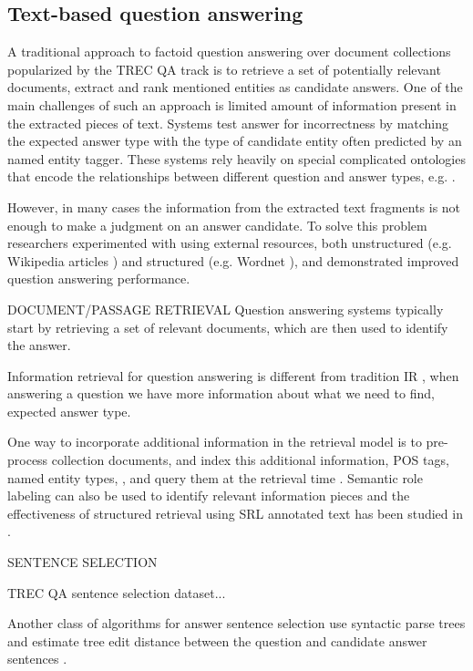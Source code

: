 \subsection{Text-based question answering}

A traditional approach to factoid question answering over document collections popularized by the TREC QA track is to retrieve a set of potentially relevant documents, extract and rank mentioned entities as candidate answers.
One of the main challenges of such an approach is limited amount of information present in the extracted pieces of text.
Systems test answer for incorrectness by matching the expected answer type with the type of candidate entity often predicted by an named entity tagger.
These systems rely heavily on special complicated ontologies that encode the relationships between different question and answer types, e.g. \cite{hovy2000question,LiRoth02,li2006learning, prager2006question}.

However, in many cases the information from the extracted text fragments is not enough to make a judgment on an answer candidate.
To solve this problem researchers experimented with using external resources, both unstructured (e.g. Wikipedia articles  \cite{ahn2005using, buscaldi2006mining}) and structured (e.g. Wordnet \cite{pasca2001informative}), and demonstrated improved question answering performance.


DOCUMENT/PASSAGE RETRIEVAL
Question answering systems typically start by retrieving a set of relevant documents, which are then used to identify the answer.

Information retrieval for question answering is different from tradition IR \cite{keikha2014retrieving}, \ie when answering a question we have more information about what we need to find, \eg expected answer type.

One way to incorporate additional information in the retrieval model is to pre-process collection documents, and index this additional information, \eg POS tags, named entity types, \etc, and query them at the retrieval time \cite{yao2013automatic}.
Semantic role labeling can also be used to identify relevant information pieces and the effectiveness of structured retrieval using SRL annotated text has been studied in \cite{bilotti2007structured}.

SENTENCE SELECTION

TREC QA sentence selection dataset...

Another class of algorithms for answer sentence selection use syntactic parse trees and estimate tree edit distance between the question and candidate answer sentences \cite{yao2013answer}.

